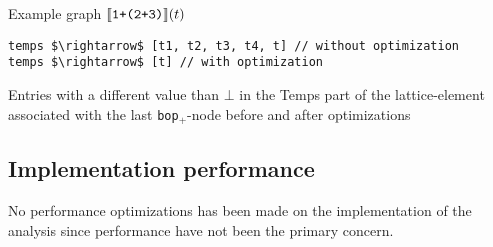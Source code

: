 \begin{graph}
\centering
\begin{adjustbox}{max size={1\textwidth}{.25\textheight}, margin = 10pt}\end{adjustbox}

\caption{Example graph $\llbracket \texttt{1+(2+3)}\rrbracket(t)$}
\label{graph:exexpr1}
\end{graph}

\begin{program}
\begin{lstlisting}[mathescape]
temps $\rightarrow$ [t1, t2, t3, t4, t] // without optimization
temps $\rightarrow$ [t] // with optimization
\end{lstlisting}
\caption{Entries with a different value than $\bot$ in the Temps part of the lattice-element associated with the last \texttt{bop$_+$}-node before and after optimizations}
\label{lst:exampleLattice}
\end{program}

\subsection{Implementation performance}
No performance optimizations has been made on the implementation of the analysis since performance have not been the primary concern.

